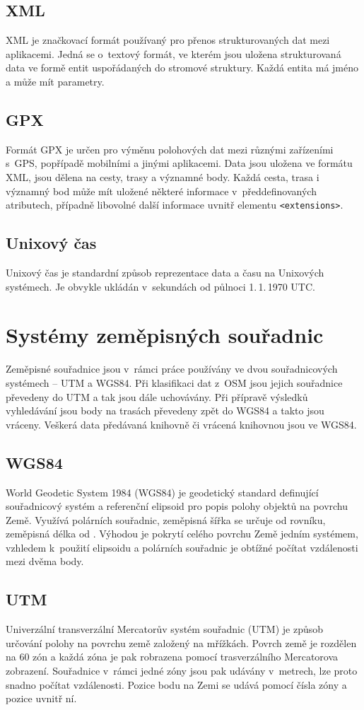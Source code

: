 \subsection{XML}
XML \cite{XML} je značkovací formát používaný pro přenos strukturovaných dat
mezi aplikacemi. Jedná se o~textový formát, ve kterém jsou uložena strukturovaná
data ve formě entit uspořádaných do stromové struktury. Každá entita má jméno a
může mít parametry. 

\subsection{GPX}
Formát GPX\cite{GPX} je určen pro výměnu polohových dat mezi různými zařízeními s~GPS,
popřípadě mobilními a jinými aplikacemi. Data jsou uložena ve formátu XML, jsou
dělena na cesty, trasy a významné body. Každá cesta, trasa i významný bod může
mít uložené některé informace v~předdefinovaných atributech, případně libovolné
další informace uvnitř elementu {\tt <extensions>}. 

\subsection{Unixový čas}
Unixový čas je standardní způsob reprezentace data a času na Unixových
systémech. Je obvykle ukládán v~sekundách od půlnoci 1.\,1.\,1970 UTC.

\section{Systémy zeměpisných souřadnic}
Zeměpisné souřadnice jsou v~rámci práce používány ve dvou souřadnicových
systémech -- UTM a WGS84. Při klasifikaci dat z~OSM jsou jejich souřadnice
převedeny do UTM a tak jsou dále uchovávány. Při přípravě výsledků vyhledávání
jsou body na trasách převedeny zpět do WGS84 a takto jsou vráceny. Veškerá data
předávaná knihovně či vrácená knihovnou jsou ve WGS84.
\subsection{WGS84}
World Geodetic System 1984 (WGS84) \cite{WGS84} je geodetický standard
definující souřadnicový systém a referenční elipsoid pro popis polohy objektů na
povrchu Země. Využívá polárních souřadnic, zeměpisná šířka se určuje od rovníku,
zeměpisná délka od . Výhodou je pokrytí celého
povrchu Země jedním systémem, vzhledem k~použití elipsoidu a polárních souřadnic
je obtížné počítat vzdálenosti mezi dvěma body.
\subsection{UTM}
Univerzální transverzální Mercatorův systém souřadnic (UTM) \cite{UTM} je způsob
určování polohy na povrchu země založený na mřížkách. Povrch země je rozdělen na
60 zón a každá zóna je pak robrazena pomocí trasverzálního Mercatorova
zobrazení. Souřadnice v~rámci jedné zóny jsou pak udávány v~metrech, lze proto
snadno počítat vzdálenosti. Pozice bodu na Zemi se udává pomocí čísla zóny a
pozice uvnitř ní. 

